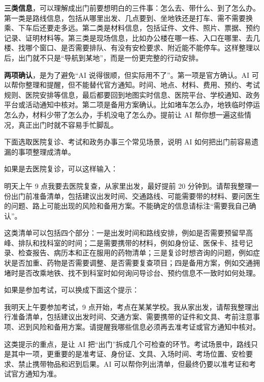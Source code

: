 \textbf{三类信息}，可以理解成出门前要想明白的三件事：怎么去、带什么、到了怎么办。
第一类是路线信息，包括从哪里出发、几点要到、坐地铁还是打车、需不需要换乘、下车后还要走多远。第二类是材料信息，包括证件、文件、照片、票据、预约记录、证明材料等。第三类是现场信息，比如办公楼在哪一栋、入口在哪里、去几楼、找哪个窗口、是否需要排队、有没有安检要求、附近能不能停车。这样整理以后，出门就不只是“导航到某地”，而是一份更完整的行动安排。

\textbf{两项确认}，是为了避免“AI 说得很顺，但实际用不了”。第一项是官方确认。AI 可以帮你整理和提醒，但不能替代官方通知。时间、地点、材料、费用、预约、考试规则、医院安排等信息，最后都要回到地图实时信息、医院平台、学校通知、政务平台或活动通知中核对。第二项是备用方案确认。比如堵车怎么办，地铁临时停运怎么办，材料少带了怎么办，手机没电了怎么办。提前让 AI 帮你想一遍这些情况，真正出门时就不容易手忙脚乱。

下面选取医院复诊、考试和政务办事三个常见场景，说明 AI 如何把出门前容易遗漏的事项整理成清单。

如果是去医院复诊，可以这样输入：

\begin{tcolorbox}[promptbox]
明天上午 9 点我要去医院复查，从家里出发，最好提前 20 分钟到。请帮我整理一份出门前准备清单，包括建议出发时间、交通路线、可能需要带的材料、要问医生的问题、路上可能出现的风险和备用方案。不能确定的信息请标注“需要我自己确认”。
\end{tcolorbox}

这类清单可以包括四个部分：一是出发时间和路线安排，例如是否需要预留早高峰、排队和找科室的时间；二是需要携带的材料，例如身份证、医保卡、挂号记录、检查报告、病历本和正在服用的药物清单；三是复诊时想咨询的问题，例如症状是否加重、药物是否需要调整、是否需要复查项目；四是备用方案，例如交通拥堵时是否改乘地铁、找不到科室时如何询问导诊台、预约信息不一致时如何处理。

如果是参加考试，可以换成下面这个提示：

\begin{tcolorbox}[promptbox]
我明天上午要参加考试，9 点开始，考点在某某学校。我从家出发，请帮我整理出行准备清单，包括建议出发时间、交通方案、需要携带的证件和文具、考前注意事项、迟到风险和备用方案。请提醒我哪些信息必须再去准考证或官方通知中核对。
\end{tcolorbox}

这类提示的重点，是让 AI 把“出门”拆成几个可检查的环节。考试场景中，路线只是其中一项，更重要的是准考证、身份证、文具、入场时间、考场位置、安检要求、禁止携带物品和迟到后果。AI 可以帮你列出清单，但最终仍要以准考证和考试官方通知为准。

